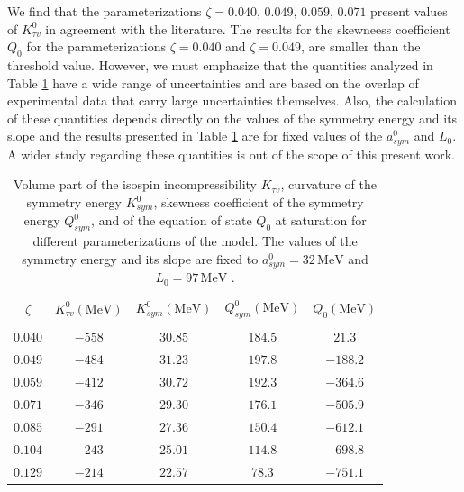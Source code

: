 \documentclass[twocolumn,showpacs,aps]{revtex4}
\begin{document}
We find that the parameterizations $\zeta=0.040,\,0.049,\,0.059,\,0.071$ present values of $K^0_{\tau v}$ in agreement with the literature. 
The results for the skewneess coefficient $Q_0$ for the parameterizations $\zeta=0.040$ and $\zeta=0.049$, are smaller than the threshold value.
However, we must emphasize that the quantities analyzed in Table \ref{Tab_properties} have a wide range of uncertainties and are based on the overlap of 
experimental data that carry large uncertainties themselves. 
Also, the calculation of these quantities depends directly on the values of the symmetry energy and its slope and 
the results presented in Table \ref{Tab_properties} are for fixed values of the $a_{sym}^0$ and $L_0$.
A wider study regarding these quantities is out of the scope of this present work.  


\begin{table}[t]
\caption{Volume part of the isospin incompressibility $K_{\tau v}$, curvature of the symmetry energy $K^0_{sym}$,  
skewness coefficient of the symmetry energy $Q^0_{sym}$, and of the equation of state $Q_0$ at saturation 
for different parameterizations of the model. 
The values of the symmetry energy and its slope are fixed to $a_{sym}^0=32\, \mathrm{MeV}$
  and $L_0=97\, \mathrm{MeV}$
 .} 
\begin{center} \label{Tab_properties}
\begin{tabular}{|c|c|c|c|c|} 
\hline 
$\zeta$ & $K^0_{\tau v}(\mathrm{MeV})$ & $K^0_{sym}(\mathrm{MeV})$ & $Q^0_{sym}(\mathrm{MeV})$ & $Q_0(\mathrm{MeV})$ \\
& & & & \\ 
\hline \hline
$0.040 $ &  $-558$ & $30.85$ & $184.5$ & $21.3$ \tabularnewline
$0.049 $ &  $-484$ & $31.23$ & $197.8$ & $-188.2$ \tabularnewline
$0.059 $ &  $-412$ & $30.72$ & $192.3$ & $-364.6$ \tabularnewline
$0.071 $ &  $-346$ & $29.30$ & $176.1$ & $-505.9$ \tabularnewline
$0.085 $ &  $-291$ & $27.36$ & $150.4$ & $-612.1$ \tabularnewline
$0.104 $ &  $-243$ & $25.01$ & $114.8$ & $-698.8$ \tabularnewline
$0.129 $ &  $-214$ & $22.57$ & $78.3$ & $-751.1$ \tabularnewline
\hline\hline
\end{tabular}
\end{center}
\end{table}



\end{document}

